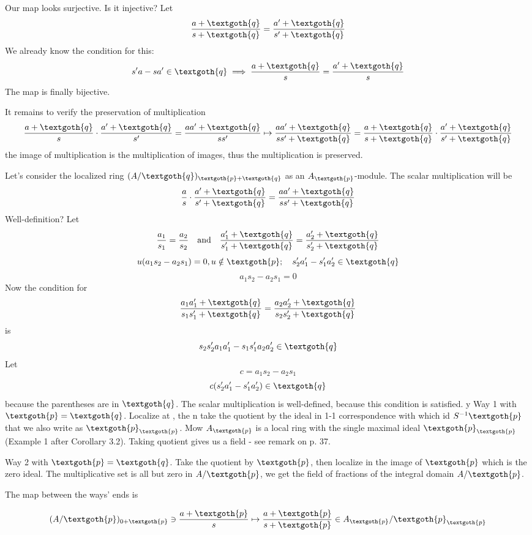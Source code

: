 \documentclass{article}
\begin{document}
Our map looks surjective. Is it injective? Let
\[
\frac{a + \textgoth{q}}{s + \textgoth{q}} = \frac{a' + \textgoth{q}}{s' + \textgoth{q}}
\]
\noindent
We already know the condition for this:
\[
s'a - sa' \in \textgoth{q} \implies \frac{a + \textgoth{q}}{s} = \frac{a' + \textgoth{q}}{s}
\]
\noindent
The map is finally bijective. 

It remains to verify the preservation of multiplication
\[
\frac{a + \textgoth{q}}{s} \cdot \frac{a' + \textgoth{q}}{s'} 
= \frac{aa' + \textgoth{q}}{ss'} \mapsto 
\frac{aa' + \textgoth{q}}{ss' + \textgoth{q}} 
= \frac{a + \textgoth{q}}{s + \textgoth{q}} \cdot \frac{a' + \textgoth{q}}{s' + \textgoth{q}}
\]
\noindent
the image of multiplication is the multiplication of images, thus the multiplication is preserved.

Let's consider the localized ring $(A/\textgoth{q})_{\textgoth{p} + \textgoth{q}}$ as an $A_\textgoth{p}$-module. The scalar multiplication will be
\[
\frac{a}{s} \cdot \frac{a' + \textgoth{q}}{s' + \textgoth{q}} = 
\frac{aa' + \textgoth{q}}{ss' + \textgoth{q}}
\]
\noindent
Well-definition? Let 
\[
\frac{a_1}{s_1} = \frac{a_2}{s_2} \quad \text{and} \quad
\frac{a'_1 + \textgoth{q}}{s'_1 + \textgoth{q}} = \frac{a'_2 + \textgoth{q}}{s'_2 + \textgoth{q}}
\]
\[
u(a_1s_2 - a_2s_1) = 0, u \notin \textgoth{p}; \quad s'_2a'_1-s'_1a'_2 \in \textgoth{q}
\]
\[
a_1s_2 - a_2s_1 = 0
\]
\noindent
Now the condition for
\[
\frac{a_1a'_1 + \textgoth{q}}{s_1s'_1 + \textgoth{q}} = \frac{a_2a'_2 + \textgoth{q}}{s_2s'_2 + \textgoth{q}}
\]
\noindent
is
\[
s_2s'_2a_1a'_1 - s_1s'_1a_2a'_2 \in \textgoth{q}
\]
\noindent
Let
\[
c = a_1s_2 - a_2s_1
\]
\[
c(s'_2a'_1 - s'_1a'_2) \in \textgoth{q}
\]
\noindent
because the parentheses are in $\textgoth{q}$. The scalar multiplication is well-defined, because this condition is satisfied.
y
\vspace{2mm}
Way 1 with $\textgoth{p} = \textgoth{q}$.
\noindent
Localize at , the n take the quotient by the ideal in 1-1 correspondence with  which id $S^{-1}\textgoth{p}$ that we also write as $\textgoth{p}_\textgoth{p}$. Mow $A_\textgoth{p}$ is a local ring with the single maximal ideal $\textgoth{p}_\textgoth{p}$ (Example 1 after Corollary 3.2). Taking quotient gives us a field - see remark on p. 37.

\vspace{2mm}
Way 2 with $\textgoth{p} = \textgoth{q}$.
Take the quotient by $\textgoth{p}$, then localize in the image of $\textgoth{p}$ which is the zero ideal. The multiplicative set is all but zero in $A/\textgoth{p}$, we get the field of fractions of the integral domain $A/\textgoth{p}$.

The map between the ways' ends is

\[
(A/\textgoth{p})_{0+\textgoth{p}} \ni \frac{a + \textgoth{p}}{s} 
\mapsto
\frac{a + \textgoth{p}}{s + \textgoth{p}} \in A_\textgoth{p}/\textgoth{p}_\textgoth{p} 
\]
\end{document}
